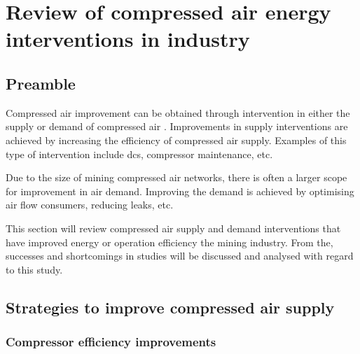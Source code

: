\section{Review of compressed air energy interventions in industry}
	\subsection{Preamble}
		Compressed air improvement can be obtained through intervention in either the supply or demand of compressed air \cite{Kriel2014Masters}. Improvements in supply interventions are achieved by increasing the efficiency of compressed air supply. Examples of this type of intervention include \gls{dcs}, compressor maintenance, etc. 
		\par
		Due to the size of mining compressed air networks, there is often a larger scope for improvement in air demand. Improving the demand is achieved by optimising air flow consumers, reducing leaks, etc.
		\par
	 	 This section will review compressed air supply and demand interventions that have improved energy or operation efficiency the mining industry. From the, successes and shortcomings in studies will be discussed and analysed with regard to this study.
	 	
	\subsection{Strategies to improve compressed air supply}

		\subsubsection{Compressor efficiency improvements}
